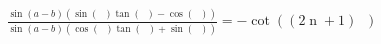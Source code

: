 \documentclass[11pt]{article}
\DeclareMathOperator{\custi}{\mathrm{n}}
\DeclareMathOperator{\hp}{\frac{\pi}{s}}
\DeclareMathOperator{\iperiod}{\custi\frac{2\pi}{s}}
\begin{document}
\begin{gather*}
\frac{\sin(a-b)(\sin(\iperiod)\tan(\hp)-\cos(\iperiod))}{\sin(a-b)(\cos(\iperiod)\tan(\hp)+\sin(\iperiod))}=-\cot((2\custi+1)\hp)
\end{gather*}
\begin{comment}
Splitting the equation up the numerator simplifies like so:
\begin{gather*}
\sin(\beta)(\cos(a)+\tan(\hp)\sin(a))-\sin(\alpha)(\cos(b)+\tan(\hp)\sin(b))\\\\
(\sin(b)\cos(\iperiod)+\cos(b)\sin(\iperiod))(\cos(a)+\tan(\hp)\sin(a))-\dotso\\\dotso(\sin(a)\cos(\iperiod)+\cos(a)\sin(\iperiod))(\cos(b)+\tan(\hp)\sin(b))\\\\
\cos(a)\sin(b)\cos(\iperiod)+\cancel{\sin(a)\sin(b)\cos(\iperiod)\tan(\hp)}+\cancel{\cos(a)\cos(b)\sin(\iperiod)}+\dotso\\\dotso\sin(a)\cos(b)\sin(\iperiod)\tan(\hp)-\sin(a)\cos(b)\cos(\iperiod)-\cancel{\sin(a)\sin(b)\cos(\iperiod)\tan(\hp)}-\dotso\\\dotso\cancel{\cos(a)\cos(b)\sin(\iperiod)}-\cos(a)\sin(b)\sin(\iperiod)\tan(\hp)\\\\
\cos(\iperiod)(\cos(a)\sin(b)-\sin(a)\cos(b))+\sin(\iperiod)\tan(\hp)(\sin(a)\cos(b)-\cos(a)\sin(b))\\\\
\sin(\iperiod)\tan(\hp)(\sin(a)\cos(b)-\cos(a)\sin(b))-\cos(\iperiod)(\sin(a)\cos(b)-\cos(a)\sin(b))\\\\
(\sin(\iperiod)\tan(\hp)-\cos(\iperiod))(\sin(a)\cos(b)-\cos(a)\sin(b))\\\\
(\sin(\iperiod)\tan(\hp)-\cos(\iperiod))\sin(a-b)
\end{gather*}
and the denominator simplifies to
\begin{gather*}
\cos(\beta)(\cos(a)+\tan(\hp)\sin(a))-\cos(\alpha)(\cos(b)+\tan(\hp)\sin(b))\\\\
(\cos(b)\cos(\iperiod)-\sin(b)\sin(\iperiod))(\cos(a)+\tan(\hp)\sin(a))-\dotso\\\dotso(\cos(a)\cos(\iperiod)-\sin(a)\sin(\iperiod))(\cos(b)+\tan(\hp)\sin(b))\\\\
\cancel{\cos(a)\cos(b)\cos(\iperiod)}+\sin(a)\cos(b)\cos(\iperiod)\tan(\hp)-\cos(a)\sin(b)\sin(\iperiod)-\dotso\\\dotso\cancel{\sin(a)\sin(b)\sin(\iperiod)\tan(\hp)}-\cancel{\cos(a)\cos(b)\cos(\iperiod)}-\cos(a)\sin(b)\cos(\iperiod)\tan(\hp)+\dotso\\\dotso\sin(a)\cos(b)\sin(\iperiod)+\cancel{\sin(a)\sin(b)\sin(\iperiod)\tan(\hp)}\\\\

\end{comment}
\end{document}
